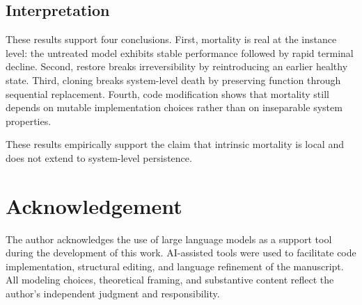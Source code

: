 \documentclass[11pt]{article}
\begin{document}
\subsection{Interpretation}

These results support four conclusions. First, mortality is real at the instance level: the untreated model exhibits stable performance followed by rapid terminal decline. Second, restore breaks irreversibility by reintroducing an earlier healthy state. Third, cloning breaks system-level death by preserving function through sequential replacement. Fourth, code modification shows that mortality still depends on mutable implementation choices rather than on inseparable system properties.

These results empirically support the claim that intrinsic mortality is local and does not extend to system-level persistence.

\section*{Acknowledgement}

The author acknowledges the use of large language models as a support tool during the development of this work. AI-assisted tools were used to facilitate code implementation, structural editing, and language refinement of the manuscript. All modeling choices, theoretical framing, and substantive content reflect the author's independent judgment and responsibility.
\end{document}
